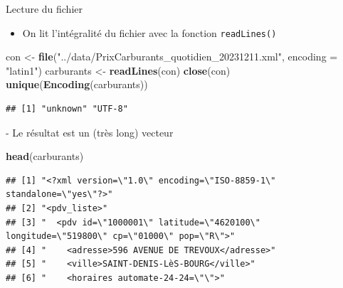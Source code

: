 \documentclass[
  ignorenonframetext,
]{beamer}
\newenvironment{Shaded}{\begin{snugshade}}{\end{snugshade}}
\newcommand{\AttributeTok}[1]{\textcolor[rgb]{0.13,0.29,0.53}{#1}}
\newcommand{\FunctionTok}[1]{\textcolor[rgb]{0.13,0.29,0.53}{\textbf{#1}}}
\newcommand{\NormalTok}[1]{#1}
\newcommand{\OtherTok}[1]{\textcolor[rgb]{0.56,0.35,0.01}{#1}}
\newcommand{\StringTok}[1]{\textcolor[rgb]{0.31,0.60,0.02}{#1}}
\providecommand{\tightlist}{%
  \setlength{\itemsep}{0pt}\setlength{\parskip}{0pt}}
\begin{document}
\begin{frame}[fragile]{Lecture du fichier}
\protect\hypertarget{lecture-du-fichier}{}
\begin{itemize}
\tightlist
\item
  On lit l'intégralité du fichier avec la fonction \texttt{readLines()}
\end{itemize}

\tiny

\begin{Shaded}
\begin{Highlighting}[]
\NormalTok{con }\OtherTok{\textless{}{-}} \FunctionTok{file}\NormalTok{(}\StringTok{"../data/PrixCarburants\_quotidien\_20231211.xml"}\NormalTok{, }\AttributeTok{encoding =} \StringTok{"latin1"}\NormalTok{)}
\NormalTok{carburants }\OtherTok{\textless{}{-}} \FunctionTok{readLines}\NormalTok{(con)}
\FunctionTok{close}\NormalTok{(con)}
\FunctionTok{unique}\NormalTok{(}\FunctionTok{Encoding}\NormalTok{(carburants))}
\end{Highlighting}
\end{Shaded}

\begin{verbatim}
## [1] "unknown" "UTF-8"
\end{verbatim}

\normalsize - Le résultat est un (très long) vecteur

\tiny

\begin{Shaded}
\begin{Highlighting}[]
\FunctionTok{head}\NormalTok{(carburants)}
\end{Highlighting}
\end{Shaded}

\begin{verbatim}
## [1] "<?xml version=\"1.0\" encoding=\"ISO-8859-1\" standalone=\"yes\"?>"                     
## [2] "<pdv_liste>"                                                                            
## [3] "  <pdv id=\"1000001\" latitude=\"4620100\" longitude=\"519800\" cp=\"01000\" pop=\"R\">"
## [4] "    <adresse>596 AVENUE DE TREVOUX</adresse>"                                           
## [5] "    <ville>SAINT-DENIS-LèS-BOURG</ville>"                                               
## [6] "    <horaires automate-24-24=\"\">"
\end{verbatim}

\normalsize
\end{frame}
\end{document}
